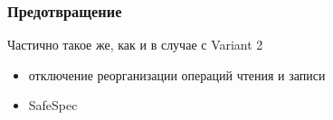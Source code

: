 







\subsubsection{Предотвращение}
\begin{frame}{\insertsubsubsection}

  Частично такое же, как и в случае с Variant 2

  \begin{itemize}
  \item отключение реорганизации операций чтения и записи
  \item SafeSpec
  \end{itemize}


\end{frame}
